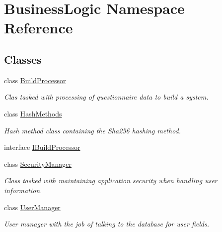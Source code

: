 \hypertarget{namespace_business_logic}{}\section{Business\+Logic Namespace Reference}
\label{namespace_business_logic}
\subsection*{Classes}
\begin{DoxyCompactItemize}
\item 
class \hyperlink{class_business_logic_1_1_build_processor}{Build\+Processor}
\begin{DoxyCompactList}\small\item\em Clas tasked with processing of questionnaire data to build a system. \end{DoxyCompactList}\item 
class \hyperlink{class_business_logic_1_1_hash_methods}{Hash\+Methods}
\begin{DoxyCompactList}\small\item\em Hash method class containing the Sha256 hashing method. \end{DoxyCompactList}\item 
interface \hyperlink{interface_business_logic_1_1_i_build_processor}{I\+Build\+Processor}
\item 
class \hyperlink{class_business_logic_1_1_security_manager}{Security\+Manager}
\begin{DoxyCompactList}\small\item\em Class tasked with maintaining application security when handling user information. \end{DoxyCompactList}\item 
class \hyperlink{class_business_logic_1_1_user_manager}{User\+Manager}
\begin{DoxyCompactList}\small\item\em User manager with the job of talking to the database for user fields. \end{DoxyCompactList}\end{DoxyCompactItemize}
